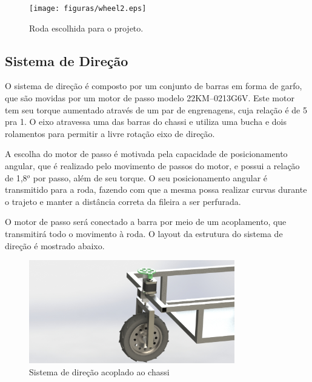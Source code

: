   \begin{figure}[!htbp]
  \begin{center}
  \texttt{[image: figuras/wheel2.eps]}
  \caption{\label{WHEEL}Roda escolhida para o projeto.}
  \end{center}
  \end{figure}

  \newpage
  \vfill
  \pagebreak

  \subsection{Sistema de Direção}
    O sistema de direção é composto por um conjunto de barras em forma de garfo, 
    que são movidas por um motor de passo modelo 22KM–0213G6V. Este motor tem seu torque aumentado através de um par de engrenagens, cuja relação é de 5 pra 1. O eixo atravessa uma das barras do chassi e utiliza uma bucha e dois rolamentos para permitir a livre rotação eixo de direção.  
     
    A escolha do motor de passo é motivada pela capacidade de posicionamento angular, que é realizado pelo movimento de passos do motor, e possui a relação de 1,8$^o$ por passo, além de seu torque. O seu posicionamento angular é transmitido para a roda, fazendo com que a mesma possa realizar curvas durante o trajeto e manter a distância correta da fileira a ser perfurada. 
    
    O motor de passo será conectado a barra por meio de um acoplamento, que transmitirá todo o movimento à roda. O layout da estrutura do sistema de direção é mostrado abaixo. 
    
    
    \begin{figure}[!htbp]
                    	\begin{center}
                    		\includegraphics[keepaspectratio=true, width=0.8\textwidth]{figuras/render2.eps}
                    		\caption{Sistema de direção acoplado ao chassi}
                    	\end{center}
     \end{figure}
                    
